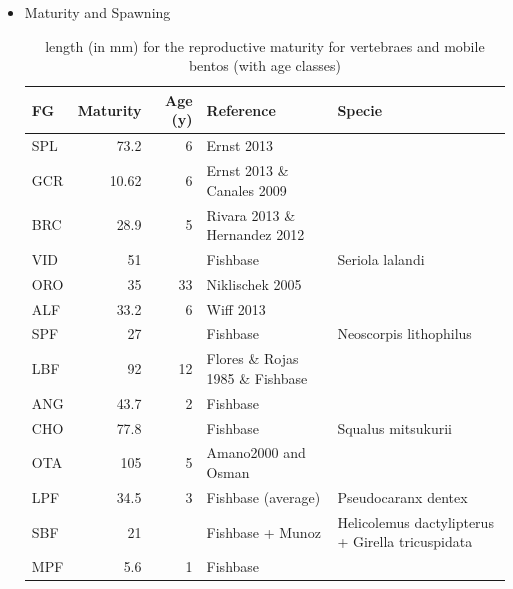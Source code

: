 \documentclass[11pt]{article}
\begin{document}
\begin{itemize}
\item Maturity and Spawning
\label{sec-5-2-1-8-5}%
\begin{table}[htb]
\caption{length (in mm) for the reproductive maturity for vertebraes and mobile bentos (with age classes)}
\begin{center}
\begin{tabular}{lrrll}
 FG   &  Maturity  &  Age (y)  &  Reference                         &  Specie                                             \\
\hline
 SPL  &      73.2  &        6  &  Ernst 2013                        &                                                     \\
 GCR  &     10.62  &        6  &  Ernst 2013 \& Canales 2009        &                                                     \\
 BRC  &      28.9  &        5  &  Rivara 2013  \& Hernandez 2012    &                                                     \\
 VID  &        51  &           &  Fishbase                          &  Seriola lalandi                                    \\
 ORO  &        35  &       33  &  Niklischek 2005                   &                                                     \\
 ALF  &      33.2  &        6  &  Wiff 2013 \                       &                                                     \\
 SPF  &        27  &           &  Fishbase                          &  Neoscorpis lithophilus                             \\
 LBF  &        92  &       12  &  Flores \& Rojas 1985 \& Fishbase  &                                                     \\
 ANG  &      43.7  &        2  &  Fishbase                          &                                                     \\
 CHO  &      77.8  &           &  Fishbase                          &  Squalus mitsukurii                                 \\
 OTA  &       105  &        5  &  Amano2000 and Osman               &                                                     \\
 LPF  &      34.5  &        3  &  Fishbase (average)                &  Pseudocaranx dentex                                \\
 SBF  &        21  &           &  Fishbase  + Munoz                 &  Helicolemus dactylipterus  + Girella tricuspidata  \\
 MPF  &       5.6  &        1  &  Fishbase                          &                                                     \\
\end{tabular}
\end{center}
\end{table}



\end{itemize}
\end{document}
